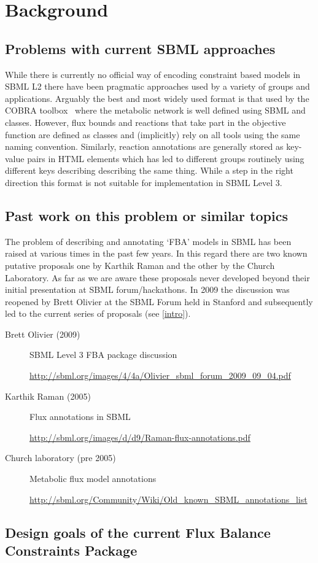 
\section{ Background }
\label{background}

\subsection{ Problems with current SBML approaches }

While there is currently no official way of encoding constraint based models in SBML L2 there have been pragmatic approaches used by a variety of groups and applications. Arguably the best and most widely used format is that used by the \textsf{COBRA toolbox}~\citep{cobra} where the metabolic network is well defined using SBML \Reaction and \Species classes. However, flux bounds and reactions that take part in the objective function are defined as \LocalParameter classes and (implicitly) rely on all tools using the same naming convention. Similarly, reaction annotations are generally stored as key-value pairs in HTML \Notes elements which has led to different groups routinely using different keys describing describing the same thing. While a step in the right direction this format is not suitable for implementation in SBML Level 3.


\subsection{ Past work on this problem or similar topics }
The problem of describing and annotating `FBA' models in SBML has been raised  at various times in the past few years. In this regard there are two known putative proposals one by Karthik Raman and the other by the Church Laboratory. As far as we are aware these proposals never developed beyond their initial presentation at SBML forum/hackathons. In 2009 the discussion was reopened by Brett Olivier at the SBML Forum held in Stanford and subsequently led to the current series of proposals (see \ref{intro}).

\begin{description}
  \item[Brett Olivier (2009)] SBML Level 3 FBA package discussion
  \item[]\url{http://sbml.org/images/4/4a/Olivier_sbml_forum_2009_09_04.pdf}
  \item[Karthik Raman (2005)] Flux annotations in SBML
  \item[]\url{http://sbml.org/images/d/d9/Raman-flux-annotations.pdf}
  \item[Church laboratory (pre 2005)] Metabolic flux model annotations
  \item[]\url{http://sbml.org/Community/Wiki/Old_known_SBML_annotations_list}
\end{description}


\subsection{ Design goals of the current Flux Balance Constraints Package }
\label{design-goals}

